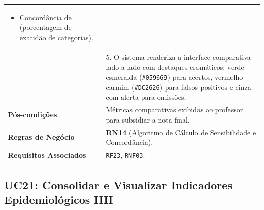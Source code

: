 \begin{table}[!ht]
\begin{tabularx}{\textwidth}{p{3.5cm} X}
\begin{itemize}
    \item $\text{Concordância de Gravidade NCC MERP}$ (porcentagem de exatidão de categorias).
\end{itemize}\\
& 5. O sistema renderiza a interface comparativa lado a lado com destaques cromáticos: verde esmeralda (\texttt{\#059669}) para acertos, vermelho carmim (\texttt{\#DC2626}) para falsos positivos e cinza com alerta para omissões. \\
\textbf{Pós-condições} & Métricas comparativas exibidas ao professor para subsidiar a nota final. \\
\textbf{Regras de Negócio} & \textbf{RN14} (Algoritmo de Cálculo de Sensibilidade e Concordância). \\
\textbf{Requisitos Associados} & \texttt{RF23}, \texttt{RNF03}. \\
\bottomrule
\end{tabularx}
\end{table}

\subsection{UC21: Consolidar e Visualizar Indicadores Epidemiológicos IHI}
\label{uc21_especificacao}

